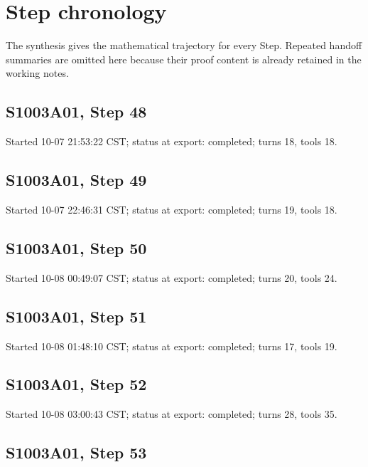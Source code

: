 \documentclass[
  10pt,
]{report}
\begin{document}
\hypertarget{step-chronology}{%
\chapter{Step chronology}\label{step-chronology}}

The synthesis gives the mathematical trajectory for every Step. Repeated
handoff summaries are omitted here because their proof content is
already retained in the working notes.

\hypertarget{s1003a01-step-48}{%
\section{S1003A01, Step 48}\label{s1003a01-step-48}}

Started 10-07 21:53:22 CST; status at export: completed; turns 18, tools
18.

\hypertarget{s1003a01-step-49}{%
\section{S1003A01, Step 49}\label{s1003a01-step-49}}

Started 10-07 22:46:31 CST; status at export: completed; turns 19, tools
18.

\hypertarget{s1003a01-step-50}{%
\section{S1003A01, Step 50}\label{s1003a01-step-50}}

Started 10-08 00:49:07 CST; status at export: completed; turns 20, tools
24.

\hypertarget{s1003a01-step-51}{%
\section{S1003A01, Step 51}\label{s1003a01-step-51}}

Started 10-08 01:48:10 CST; status at export: completed; turns 17, tools
19.

\hypertarget{s1003a01-step-52}{%
\section{S1003A01, Step 52}\label{s1003a01-step-52}}

Started 10-08 03:00:43 CST; status at export: completed; turns 28, tools
35.

\hypertarget{s1003a01-step-53}{%
\section{S1003A01, Step 53}\label{s1003a01-step-53}}
\end{document}
